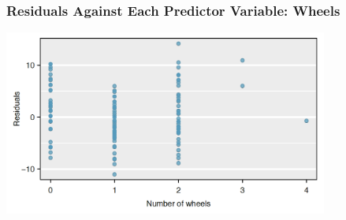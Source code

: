 \documentclass[handout]{beamer}
\begin{document}
\begin{frame}[fragile]
\frametitle{Residuals Against Each Predictor Variable: Wheels}

\begin{center}
\includegraphics[width=0.8\textwidth]{figure/pred2.png}
\end{center}

\end{frame}
\end{document}
